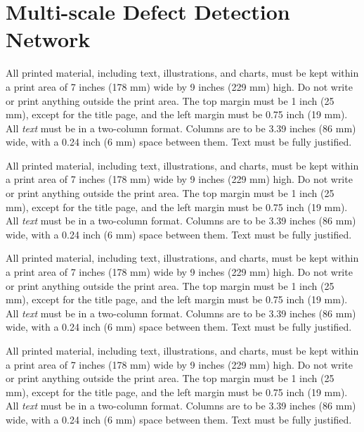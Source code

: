 \documentclass{article}
\begin{document}

\section{Multi-scale Defect Detection Network}
\label{sec:format}

All printed material, including text, illustrations, and charts, must be kept
within a print area of 7 inches (178 mm) wide by 9 inches (229 mm) high. Do
not write or print anything outside the print area. The top margin must be 1
inch (25 mm), except for the title page, and the left margin must be 0.75 inch
(19 mm).  All {\it text} must be in a two-column format. Columns are to be 3.39
inches (86 mm) wide, with a 0.24 inch (6 mm) space between them. Text must be
fully justified.

All printed material, including text, illustrations, and charts, must be kept
within a print area of 7 inches (178 mm) wide by 9 inches (229 mm) high. Do
not write or print anything outside the print area. The top margin must be 1
inch (25 mm), except for the title page, and the left margin must be 0.75 inch
(19 mm).  All {\it text} must be in a two-column format. Columns are to be 3.39
inches (86 mm) wide, with a 0.24 inch (6 mm) space between them. Text must be
fully justified.

All printed material, including text, illustrations, and charts, must be kept
within a print area of 7 inches (178 mm) wide by 9 inches (229 mm) high. Do
not write or print anything outside the print area. The top margin must be 1
inch (25 mm), except for the title page, and the left margin must be 0.75 inch
(19 mm).  All {\it text} must be in a two-column format. Columns are to be 3.39
inches (86 mm) wide, with a 0.24 inch (6 mm) space between them. Text must be
fully justified.

All printed material, including text, illustrations, and charts, must be kept
within a print area of 7 inches (178 mm) wide by 9 inches (229 mm) high. Do
not write or print anything outside the print area. The top margin must be 1
inch (25 mm), except for the title page, and the left margin must be 0.75 inch
(19 mm).  All {\it text} must be in a two-column format. Columns are to be 3.39
inches (86 mm) wide, with a 0.24 inch (6 mm) space between them. Text must be
fully justified.
\end{document}

